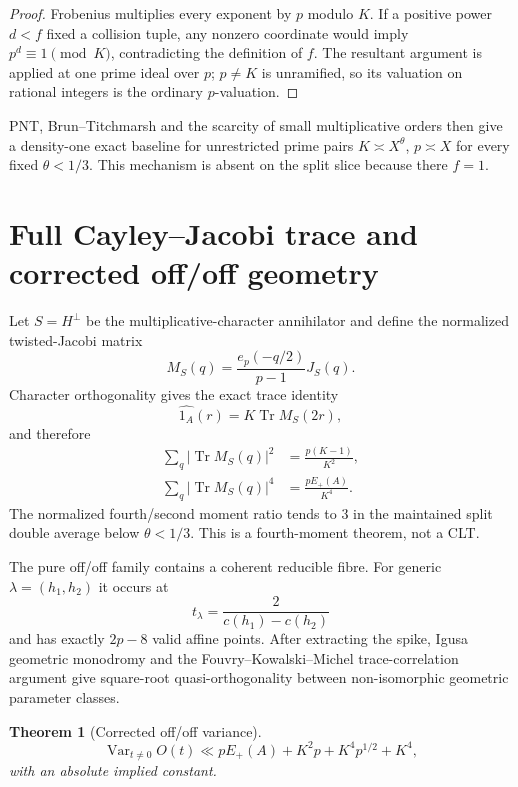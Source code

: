 \documentclass[11pt]{article}
\newtheorem{theorem}{Theorem}[section]
\newcommand{\Var}{\operatorname{Var}}
\begin{document}
\begin{proof}
Frobenius multiplies every exponent by $p$ modulo $K$.  If a positive power
$d<f$ fixed a collision tuple, any nonzero coordinate would imply
$p^d\equiv1\pmod K$, contradicting the definition of $f$.  The resultant
argument is applied at one prime ideal over $p$; $p\ne K$ is unramified, so its
valuation on rational integers is the ordinary $p$-valuation.
\end{proof}

PNT, Brun--Titchmarsh and the scarcity of small multiplicative orders then give
a density-one exact baseline for unrestricted prime pairs
$K\asymp X^\theta$, $p\asymp X$ for every fixed $\theta<1/3$.  This mechanism
is absent on the split slice because there $f=1$.

\section{Full Cayley--Jacobi trace and corrected off/off geometry}

Let $S=H^\perp$ be the multiplicative-character annihilator and define the
normalized twisted-Jacobi matrix
\[
M_S(q)=\frac{e_p(-q/2)}{p-1}J_S(q).
\]
Character orthogonality gives the exact trace identity
\begin{equation}\label{eq:jacobi}
\widehat{1_A}(r)=K\operatorname{Tr}M_S(2r),
\end{equation}
and therefore
\begin{align}
\sum_q|\operatorname{Tr}M_S(q)|^2&=\frac{p(K-1)}{K^2},\label{eq:trace2}\\
\sum_q|\operatorname{Tr}M_S(q)|^4&=\frac{pE_+(A)}{K^4}.\label{eq:trace4}
\end{align}
The normalized fourth/second moment ratio tends to $3$ in the maintained split
double average below $\theta<1/3$.  This is a fourth-moment theorem, not a CLT.

The pure off/off family contains a coherent reducible fibre.  For generic
$\lambda=(h_1,h_2)$ it occurs at
\[
t_\lambda=\frac{2}{c(h_1)-c(h_2)}
\]
and has exactly $2p-8$ valid affine points.  After extracting the spike, Igusa
geometric monodromy \cite{BLV2009} and the Fouvry--Kowalski--Michel
trace-correlation argument \cite{FKM2013} give square-root quasi-orthogonality
between non-isomorphic geometric parameter classes.

\begin{theorem}[Corrected off/off variance]\label{thm:offoff}
\begin{equation}\label{eq:offoff}
\Var_{t\ne0}O(t)
\ll pE_+(A)+K^2p+K^4p^{1/2}+K^4,
\end{equation}
with an absolute implied constant.
\end{theorem}
\end{document}
